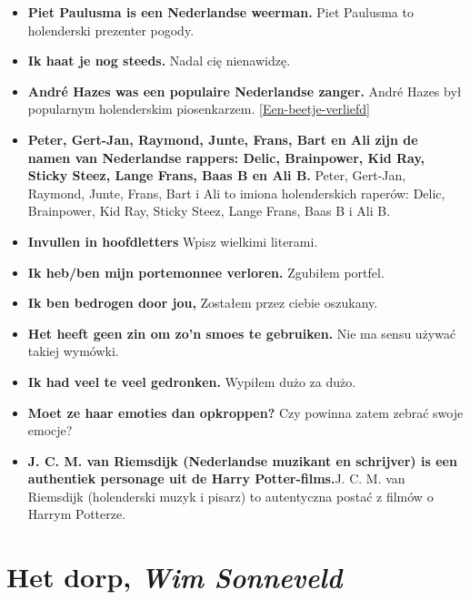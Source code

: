\documentclass[
]{book}
\begin{document}
\begin{itemize}
\item
  \textbf{Piet Paulusma is een Nederlandse weerman.} Piet Paulusma to holenderski prezenter pogody.\\
\item
  \textbf{Ik haat je nog steeds.} Nadal cię nienawidzę.\\
\item
  \textbf{André Hazes was een populaire Nederlandse zanger.} André Hazes był popularnym holenderskim piosenkarzem. \ref{Een-beetje-verliefd}\\
\item
  \textbf{Peter, Gert-Jan, Raymond, Junte, Frans, Bart en Ali zijn de namen van Nederlandse rappers: Delic, Brainpower, Kid Ray, Sticky Steez, Lange Frans, Baas B en Ali B.} Peter, Gert-Jan, Raymond, Junte, Frans, Bart i Ali to imiona holenderskich raperów: Delic, Brainpower, Kid Ray, Sticky Steez, Lange Frans, Baas B i Ali B.\\
\item
  \textbf{Invullen in hoofdletters} Wpisz wielkimi literami.\\
\item
  \textbf{Ik heb/ben mijn portemonnee verloren.} Zgubiłem portfel.\\
\item
  \textbf{Ik ben bedrogen door jou,} Zostałem przez ciebie oszukany.\\
\item
  \textbf{Het heeft geen zin om zo'n smoes te gebruiken.} Nie ma sensu używać takiej wymówki.\\
\item
  \textbf{Ik had veel te veel gedronken.} Wypiłem dużo za dużo.\\
\item
  \textbf{Moet ze haar emoties dan opkroppen?} Czy powinna zatem zebrać swoje emocje?\\
\item
  \textbf{J. C. M. van Riemsdijk (Nederlandse muzikant en schrijver) is een authentiek personage uit de Harry Potter-films.}J. C. M. van Riemsdijk (holenderski muzyk i pisarz) to autentyczna postać z filmów o Harrym Potterze.
\end{itemize}

\hypertarget{Het-dorp}{%
\section{\texorpdfstring{Het dorp, \emph{Wim Sonneveld}}{Het dorp, Wim Sonneveld}}\label{Het-dorp}}
\end{document}
